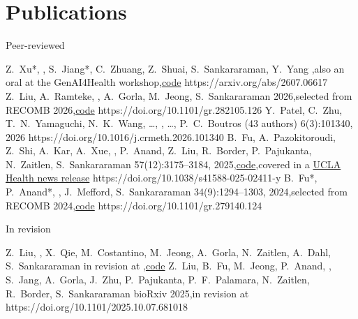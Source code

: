 \documentclass[10pt,letterpaper]{article}
\newcommand{\subhead}[1]{{\sffamily\color{accent}#1}\par}
\begin{document}
\section{Publications}
\subhead{Peer-reviewed}
\begin{itemize}
      {Z.~Xu*, \me*, S.~Jiang*, C.~Zhuang, Z.~Shuai, S.~Sankararaman, Y.~Yang}
      {\sep also an oral at the GenAI4Health workshop\sep\href{https://github.com/yang-ai-lab/Inertia-1}{code}}
      {https://arxiv.org/abs/2607.06617}
      {Z.~Liu, A.~Ramteke, \me, A.~Gorla, M.~Jeong, S.~Sankararaman}
      { 2026\sep selected from RECOMB 2026\sep\href{https://github.com/sriramlab/ENGINE}{code}}
      {https://doi.org/10.1101/gr.282105.126}
      {Y.~Patel, C.~Zhu, T.~N.~Yamaguchi, N.~K.~Wang, \ldots, \me, \ldots, P.~C.~Boutros (43 authors)}
      { 6(3):101340, 2026}
      {https://doi.org/10.1016/j.crmeth.2026.101340}
      {B.~Fu, A.~Pazokitoroudi, Z.~Shi, A.~Kar, A.~Xue, \me, P.~Anand, Z.~Liu, R.~Border, P.~Pajukanta,
      N.~Zaitlen, S.~Sankararaman}
      { 57(12):3175--3184, 2025\sep\href{https://github.com/sriramlab/FAME}{code}\sep covered in a
      \href{https://www.uclahealth.org/news/release/researchers-develop-new-computational-tool-understand-how}{UCLA Health news release}}
      {https://doi.org/10.1038/s41588-025-02411-y}
      {B.~Fu*, P.~Anand*, \me*, J.~Mefford, S.~Sankararaman}
      { 34(9):1294--1303, 2024\sep selected from RECOMB 2024\sep\href{https://github.com/sriramlab/QuadKAST}{code}}
      {https://doi.org/10.1101/gr.279140.124}
\end{itemize}
\vspace{3pt}
\subhead{In revision}
\begin{itemize}
      {Z.~Liu, \me, X.~Qie, M.~Costantino, M.~Jeong, A.~Gorla, N.~Zaitlen, A.~Dahl, S.~Sankararaman}
      {in revision at \sep\href{https://github.com/sriramlab/REGENA}{code}}
      {Z.~Liu, B.~Fu, M.~Jeong, P.~Anand, \me, S.~Jang, A.~Gorla, J.~Zhu, P.~Pajukanta, P.~F.~Palamara,
      N.~Zaitlen, R.~Border, S.~Sankararaman}
      {bioRxiv 2025\sep in revision at }
      {https://doi.org/10.1101/2025.10.07.681018}
\end{itemize}
\end{document}
